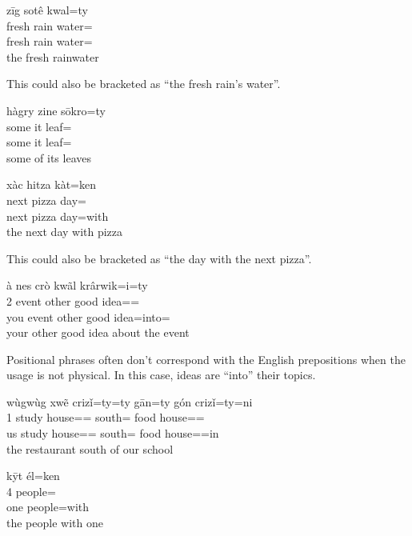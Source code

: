 \begin{exe}
    \ex
    \glll
    zīg sotê kwal=ty \\
    fresh rain water=\Poss{} \\
    fresh rain water=\Poss{} \\
    \glt
    the fresh rainwater
\end{exe}
This could also be bracketed as ``the fresh rain's water''.

\begin{exe}
    \ex
    \glll
    hàgry zine sōkro=ty \\
    some it leaf=\Poss{} \\
    some it leaf=\Poss{} \\
    \glt
    some of its leaves
\end{exe}

\begin{exe}
    \ex
    \glll
    xàc hitza kàt=ken \\
    next pizza day=\Com{} \\
    next pizza day=with \\
    \glt
    the next day with pizza
\end{exe}
This could also be bracketed as ``the day with the next pizza''.

\begin{exe}
    \ex
    \glll
    à nes crò kwãl krârwik=i=ty \\
    2\Sg{} event other good idea=\IllThree{}=\Poss{} \\
    you event other good idea=into=\Poss{} \\
    \glt
    your other good idea about the event
\end{exe}
Positional phrases often don't correspond with the English prepositions
when the usage is not physical.
In this case, ideas are ``into'' their topics.

\begin{exe}
    \ex
    \glll
    wùgwùg xwẽ crizǐ=ty=ty gān=ty gón crizǐ=ty=ni \\
    1\Pl{} study house=\Poss{}=\Poss{} south=\Poss{} food house=\Poss{}=\InessTwo{} \\
    us study house=\Poss{}=\Poss{} south=\Poss{} food house=\Poss{}=in \\
    \glt
    the restaurant south of our school
\end{exe}

\begin{exe}
    \ex
    \glll
    kȳt él=ken \\
    4\Sg{} people=\Com{} \\
    one people=with \\
    \glt
    the people with one
\end{exe}


